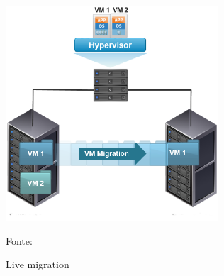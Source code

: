 \begin{figure}[h!]
 \centering
 \includegraphics[width=300px]{img/vms_migration.eps}
 \caption{Live migration}
 Fonte: \citet{spaniol2015}
 \label{fig:vms_migration}
\end{figure}


